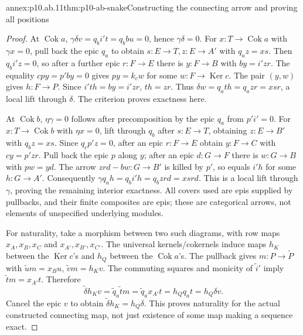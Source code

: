 \begin{annexitem}{annex:p10.ab.11}{thm:p10-ab-snake}{Constructing the connecting arrow and proving all positions}
\begin{proof}
At \(\operatorname{Cok}a\),
\(\gamma\delta v=q_bi't=q_bbu=0\), hence \(\gamma\delta=0\).
For \(x:T\to\operatorname{Cok}a\) with \(\gamma x=0\), pull
back the epic \(q_a\) to obtain \(s:E\to T,z:E\to A'\) with
\(q_az=xs\). Then \(q_bi'z=0\), so after a further epic
\(r:F\to E\) there is \(y:F\to B\) with \(by=i'zr\).
The equality \(cpy=p'by=0\) gives \(py=k_cw\) for some
\(w:F\to\operatorname{Ker}c\). The pair \((y,w)\) gives
\(h:F\to P\). Since \(i'th=by=i'zr\), \(th=zr\).
Thus \(\delta w=q_ath=q_azr=xsr\), a local lift through
\(\delta\). The criterion proves exactness here.

At \(\operatorname{Cok}b\), \(\eta\gamma=0\) follows after
precomposition by the epic \(q_a\) from \(p'i'=0\).
For \(x:T\to\operatorname{Cok}b\) with \(\eta x=0\), lift
through \(q_b\) after \(s:E\to T\), obtaining \(z:E\to B'\)
with \(q_bz=xs\). Since \(q_cp'z=0\), after an epic
\(r:F\to E\) obtain \(y:F\to C\) with \(cy=p'zr\).
Pull back the epic \(p\) along \(y\); after an epic \(d:G\to F\)
there is \(w:G\to B\) with \(pw=yd\). The arrow
\(zrd-bw:G\to B'\) is killed by \(p'\), so equals \(i'h\)
for some \(h:G\to A'\). Consequently
\(\gamma q_ah=q_bi'h=q_bzrd=xsrd\).
This is a local lift through \(\gamma\), proving the remaining
interior exactness. All covers used are epis supplied by pullbacks, and
their finite composites are epis; these are categorical arrows, not
elements of unspecified underlying modules.

For naturality, take a morphism between two such diagrams, with row
maps \(x_A,x_B,x_C\) and \(x_{A'},x_{B'},x_{C'}\).
The universal kernels/cokernels induce maps \(h_K\) between the
\(\operatorname{Ker}c\)'s and \(h_Q\) between the
\(\operatorname{Cok}a\)'s. The pullback gives \(m:P\to\widetilde P\)
with \(\widetilde u m=x_Bu\), \(\widetilde v m=h_Kv\).
The commuting squares and monicity of \(\widetilde i'\) imply
\(\widetilde t m=x_{A'}t\). Therefore
\[
 \widetilde\delta h_Kv
 =\widetilde q_a\widetilde t m
 =\widetilde q_a x_{A'}t=h_Qq_at=h_Q\delta v.
\]
Cancel the epic \(v\) to obtain
\(\widetilde\delta h_K=h_Q\delta\). This proves naturality for
the actual constructed connecting map, not just existence of some map
making a sequence exact.
\end{proof}
\end{annexitem}

